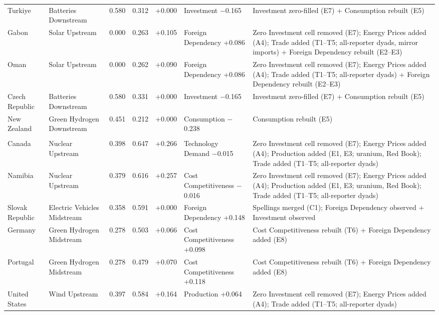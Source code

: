 \begin{longtable}{@{}>{\raggedright\arraybackslash}p{0.75in} >{\raggedright\arraybackslash}p{0.95in} c c c >{\raggedright\arraybackslash}p{1.05in} >{\raggedright\arraybackslash}p{1.9in}@{}}
    Turkiye & Batteries Downstream & 0.580 & 0.312 & +0.000 & Investment $-$0.165 & Investment zero-filled (E7) + Consumption rebuilt (E5) \\
    Gabon & Solar Upstream & 0.000 & 0.263 & +0.105 & Foreign Dependency +0.086 & Zero Investment cell removed (E7); Energy Prices added (A4); Trade added (T1--T5; all-reporter dyads, mirror imports) + Foreign Dependency rebuilt (E2--E3) \\
    Oman & Solar Upstream & 0.000 & 0.262 & +0.090 & Foreign Dependency +0.086 & Zero Investment cell removed (E7); Energy Prices added (A4); Trade added (T1--T5; all-reporter dyads) + Foreign Dependency rebuilt (E2--E3) \\
    Czech Republic & Batteries Downstream & 0.580 & 0.331 & +0.000 & Investment $-$0.165 & Investment zero-filled (E7) + Consumption rebuilt (E5) \\
    New Zealand & Green Hydrogen Downstream & 0.451 & 0.212 & +0.000 & Consumption $-$0.238 & Consumption rebuilt (E5) \\
    \addlinespace
    \multicolumn{7}{@{}l}{\emph{Economic Opportunity}} \\
    Canada & Nuclear Upstream & 0.398 & 0.647 & +0.266 & Technology Demand $-$0.015 & Zero Investment cell removed (E7); Energy Prices added (A4); Production added (E1, E3; uranium, Red Book); Trade added (T1--T5; all-reporter dyads) \\
    Namibia & Nuclear Upstream & 0.379 & 0.616 & +0.257 & Cost Competitiveness $-$0.016 & Zero Investment cell removed (E7); Energy Prices added (A4); Production added (E1, E3; uranium, Red Book); Trade added (T1--T5; all-reporter dyads) \\
    Slovak Republic & Electric Vehicles Midstream & 0.358 & 0.591 & +0.000 & Foreign Dependency +0.148 & Spellings merged (C1); Foreign Dependency observed + Investment observed \\
    Germany & Green Hydrogen Midstream & 0.278 & 0.503 & +0.066 & Cost Competitiveness +0.098 & Cost Competitiveness rebuilt (T6) + Foreign Dependency added (E8) \\
    Portugal & Green Hydrogen Midstream & 0.278 & 0.479 & +0.070 & Cost Competitiveness +0.118 & Cost Competitiveness rebuilt (T6) + Foreign Dependency added (E8) \\
    United States & Wind Upstream & 0.397 & 0.584 & +0.164 & Production +0.064 & Zero Investment cell removed (E7); Energy Prices added (A4); Trade added (T1--T5; all-reporter dyads) \\

\end{longtable}
